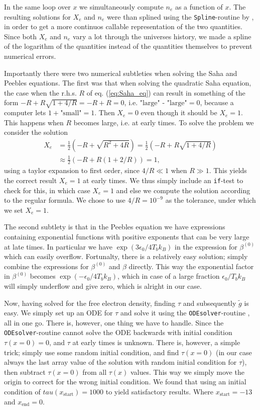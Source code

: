 \documentclass[twocolumn]{aastex62}
\begin{document}
In the same loop over $x$ we simultaneously compute $n_e$ as a function of $x$. The resulting solutions for $X_e$ and $n_e$ were than splined using the \texttt{Spline}-routine by \cite{winther:2020}, in order to get a more continuos callable representation of the two quantities. Since both $X_e$ and $n_e$ vary a lot through the universes history, we made a spline of the logarithm of the quantities instead of the quantities themselves to prevent numerical errors.

Importantly there were two numerical subtleties when solving the Saha and Peebles equations. The first was that when solving the quadratic Saha equation, the case when the r.h.s. $R$ of eq. (\ref{eq:Saha_eq}) can result in something of the form $-R + R\sqrt{1 + 4/R} = -R + R = 0$, i.e. $\text{"large" - "large"} = 0$, because a computer lets $1 + \text{"small"} = 1$. Then $X_e = 0$ even though it should be $X_e = 1$. This happens when $R$ becomes large, i.e. at early times. To solve the problem we consider the solution 
\begin{align}
    X_e &= \frac{1}{2} (-R + \sqrt{R^2 + 4R}) = \frac{1}{2} (-R + R\sqrt{1 + 4/R})\\
        &\approx \frac{1}{2} (-R + R(1 + 2/R)) = 1,
\end{align}
using a taylor expansion to first order, since $4/R \ll 1$ when $R\gg 1$. This yields the correct result $X_e = 1$ at early times. We thus simply include an \texttt{if}-test to check for this, in which case $X_e = 1$ and else we compute the solution according to the regular formula. We chose to use $4/R = 10^{-9}$ as the tolerance, under which we set $X_e = 1$. 

The second subtlety is that in the Peebles equation we have expressions containing exponential functions with positive exponents that can be very large at late times. In particular we have $\exp\left(3\epsilon_0 / 4T_b k_B\right)$ in the expression for $\beta^{(0)}$ which can easily overflow. Fortunalty, there is a relatively easy solution; simply combine the expressions for $\beta^{(0)}$ and $\beta$ directly. This way the exponential factor in $\beta^{(0)}$ becomes $\exp\left(-\epsilon_0 / 4T_b k_B\right)$, which in case of a large fraction $\epsilon_0 / T_b k_B$ will simply underflow and give zero, which is alright in our case.

Now, having solved for the free electron density, finding $\tau$ and subsequently $\tilde{g}$ is easy. We simply set up an ODE for $\tau$ and solve it using the \texttt{ODEsolver}-routine \citep[]{winther:2020}, all in one go. There is, however, one thing we have to handle. Since the \texttt{ODEsolver}-routine cannot solve the ODE backwards with initial condition $\tau(x = 0) = 0$, and $\tau$ at early times is unknown. There is, however, a simple trick; simply use some random initial condition, and find $\tau(x=0)$ (in our case always the last array value of the solution with random initial condition for $\tau$), then subtract $\tau(x = 0)$ from all $\tau(x)$ values. This way we simply move the origin to correct for the wrong initial condition. We found that using an initial condition of $tau(x_\text{start}) = 1000$ to yield satisfactory results. Where $x_\text{start} = -13$ and $x_\text{end} = 0$. 
\end{document}

